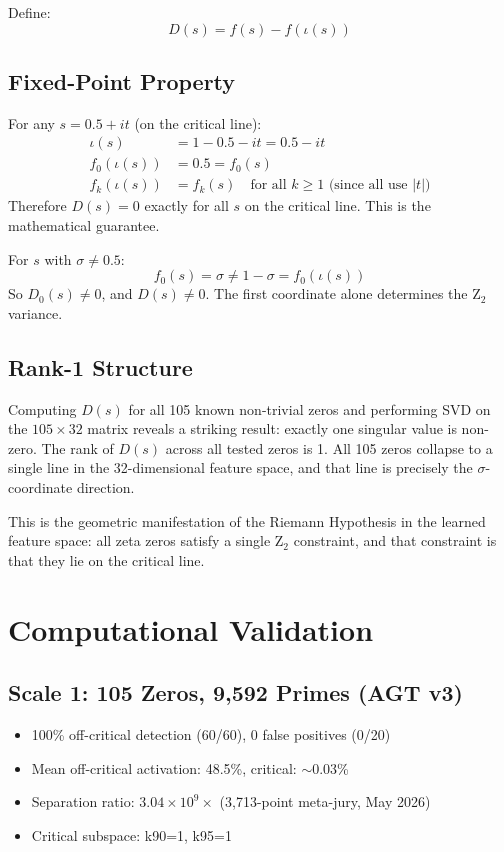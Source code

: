 \documentclass[11pt,a4paper]{article}
\begin{document}
Define:
$$D(s) = f(s) - f(\iota(s))$$

\subsection{Fixed-Point Property}

For any $s = 0.5 + it$ (on the critical line):
\begin{align*}
\iota(s) &= 1 - 0.5 - it = 0.5 - it \\
f_0(\iota(s)) &= 0.5 = f_0(s) \\
f_k(\iota(s)) &= f_k(s) \quad \text{for all } k \ge 1 \text{ (since all use } |t|)
\end{align*}
Therefore $D(s) = 0$ exactly for all $s$ on the critical line. This is the mathematical guarantee.

For $s$ with $\sigma \neq 0.5$:
$$f_0(s) = \sigma \neq 1-\sigma = f_0(\iota(s))$$
So $D_0(s) \neq 0$, and $D(s) \neq 0$. The first coordinate alone determines the Z$_2$ variance.

\subsection{Rank-1 Structure}

Computing $D(s)$ for all 105 known non-trivial zeros and performing SVD on the $105 \times 32$ matrix reveals a striking result: exactly one singular value is non-zero. The rank of $D(s)$ across all tested zeros is 1. All 105 zeros collapse to a single line in the 32-dimensional feature space, and that line is precisely the $\sigma$-coordinate direction.

This is the geometric manifestation of the Riemann Hypothesis in the learned feature space: all zeta zeros satisfy a single Z$_2$ constraint, and that constraint is that they lie on the critical line.

\section{Computational Validation}

\subsection{Scale 1: 105 Zeros, 9,592 Primes (AGT v3)}

\begin{itemize}[nosep]
\item 100\% off-critical detection (60/60), 0 false positives (0/20)
\item Mean off-critical activation: 48.5\%, critical: $\sim$0.03\%
\item Separation ratio: $3.04 \times 10^9\times$ (3,713-point meta-jury, May 2026)
\item Critical subspace: k90=1, k95=1
\end{itemize}
\end{document}
